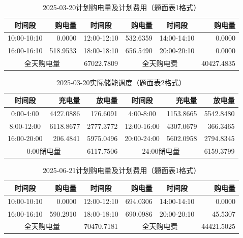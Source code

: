 \begin{table}[htbp]\centering
\caption{2025-03-20计划购电量及计划费用（题面表1格式）}
\begin{tabular}{|c|r|c|r|c|r|}\hline
时间段 & 购电量 & 时间段 & 购电量 & 时间段 & 购电量 \\\hline
10:00-10:10 & 0.0000 & 12:00-12:10 & 532.6359 & 14:00-14:10 & 0.0000 \\\hline
16:00-16:10 & 518.9533 & 18:00-18:10 & 656.5490 & 20:00-20:10 & 0.0000 \\\hline
\multicolumn{2}{|c|}{全天购电量} & 67022.7809 & \multicolumn{2}{c|}{全天购电费} & 40427.4835 \\\hline
\end{tabular}\end{table}
\begin{table}[htbp]\centering
\caption{2025-03-20实际储能调度（题面表2格式）}
\begin{tabular}{|c|r|r|c|r|r|}\hline
时间段 & 充电量 & 放电量 & 时间段 & 充电量 & 放电量 \\\hline
0:00-4:00 & 4427.0886 & 176.6091 & 4:00-8:00 & 1153.8665 & 5542.8480 \\\hline
8:00-12:00 & 6118.8677 & 2777.3772 & 12:00-16:00 & 4307.0679 & 366.3465 \\\hline
16:00-20:00 & 206.4841 & 5975.0496 & 20:00-24:00 & 5602.0958 & 2794.8345 \\\hline
\multicolumn{2}{|c|}{0:00储电量} & 6117.7506 & \multicolumn{2}{c|}{24:00储电量} & 6159.3799 \\\hline
\end{tabular}\end{table}
\begin{table}[htbp]\centering
\caption{2025-06-21计划购电量及计划费用（题面表1格式）}
\begin{tabular}{|c|r|c|r|c|r|}\hline
时间段 & 购电量 & 时间段 & 购电量 & 时间段 & 购电量 \\\hline
10:00-10:10 & 0.0000 & 12:00-12:10 & 694.0306 & 14:00-14:10 & 0.0000 \\\hline
16:00-16:10 & 590.2910 & 18:00-18:10 & 690.0986 & 20:00-20:10 & 45.5307 \\\hline
\multicolumn{2}{|c|}{全天购电量} & 70470.7181 & \multicolumn{2}{c|}{全天购电费} & 44421.5025 \\\hline
\end{tabular}\end{table}
